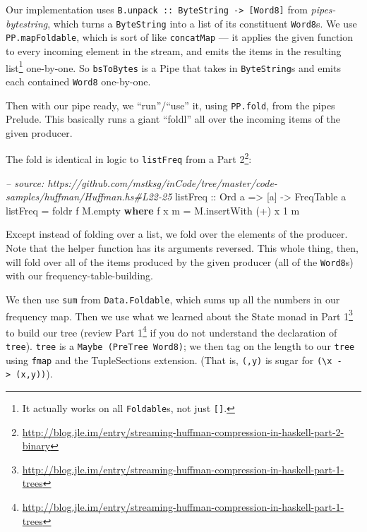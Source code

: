 \documentclass[]{article}
\newenvironment{Shaded}{\begin{snugshade}}{\end{snugshade}}
\newcommand{\CommentTok}[1]{\textcolor[rgb]{0.56,0.35,0.01}{\textit{#1}}}
\newcommand{\DataTypeTok}[1]{\textcolor[rgb]{0.13,0.29,0.53}{#1}}
\newcommand{\DecValTok}[1]{\textcolor[rgb]{0.00,0.00,0.81}{#1}}
\newcommand{\FunctionTok}[1]{\textcolor[rgb]{0.00,0.00,0.00}{#1}}
\newcommand{\KeywordTok}[1]{\textcolor[rgb]{0.13,0.29,0.53}{\textbf{#1}}}
\newcommand{\NormalTok}[1]{#1}
\newcommand{\OtherTok}[1]{\textcolor[rgb]{0.56,0.35,0.01}{#1}}
\renewcommand{\href}[2]{#2\footnote{\url{#1}}}
\begin{document}
Our implementation uses
\texttt{B.unpack\ ::\ ByteString\ -\textgreater{}\ {[}Word8{]}} from
\emph{pipes-bytestring}, which turns a \texttt{ByteString} into a list of its
constituent \texttt{Word8}s. We use \texttt{PP.mapFoldable}, which is sort of
like \texttt{concatMap} --- it applies the given function to every incoming
element in the stream, and emits the items in the resulting list\footnote{It
  actually works on all \texttt{Foldable}s, not just \texttt{{[}{]}}.}
one-by-one. So \texttt{bsToBytes} is a Pipe that takes in \texttt{ByteString}s
and emits each contained \texttt{Word8} one-by-one.

Then with our pipe ready, we ``run''/``use'' it, using \texttt{PP.fold}, from
the pipes Prelude. This basically runs a giant ``foldl'' all over the incoming
items of the given producer.

The fold is identical in logic to \texttt{listFreq} from a
\href{http://blog.jle.im/entry/streaming-huffman-compression-in-haskell-part-2-binary}{Part
2}:

\begin{Shaded}
\begin{Highlighting}[]
\CommentTok{-- source: https://github.com/mstksg/inCode/tree/master/code-samples/huffman/Huffman.hs#L22-25}
\OtherTok{listFreq ::} \DataTypeTok{Ord}\NormalTok{ a }\OtherTok{=>}\NormalTok{ [a] }\OtherTok{->} \DataTypeTok{FreqTable}\NormalTok{ a}
\NormalTok{listFreq }\FunctionTok{=}\NormalTok{ foldr f M.empty}
  \KeywordTok{where}
\NormalTok{    f x m }\FunctionTok{=}\NormalTok{ M.insertWith (}\FunctionTok{+}\NormalTok{) x }\DecValTok{1}\NormalTok{ m}
\end{Highlighting}
\end{Shaded}

Except instead of folding over a list, we fold over the elements of the
producer. Note that the helper function has its arguments reversed. This whole
thing, then, will fold over all of the items produced by the given producer (all
of the \texttt{Word8}s) with our frequency-table-building.

We then use \texttt{sum} from \texttt{Data.Foldable}, which sums up all the
numbers in our frequency map. Then we use what we learned about the State monad
in
\href{http://blog.jle.im/entry/streaming-huffman-compression-in-haskell-part-1-trees}{Part
1} to build our tree (review
\href{http://blog.jle.im/entry/streaming-huffman-compression-in-haskell-part-1-trees}{Part
1} if you do not understand the declaration of \texttt{tree}). \texttt{tree} is
a \texttt{Maybe\ (PreTree\ Word8)}; we then tag on the length to our
\texttt{tree} using \texttt{fmap} and the TupleSections extension. (That is,
\texttt{(,y)} is sugar for
\texttt{(\textbackslash{}x\ -\textgreater{}\ (x,y))}).
\end{document}
